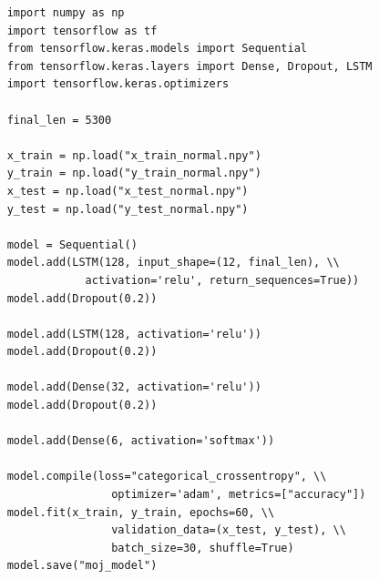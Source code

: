 \documentclass[times, utf8, diplomski]{fer}
\begin{document}
\begin{lstlisting}
    import numpy as np
    import tensorflow as tf
    from tensorflow.keras.models import Sequential
    from tensorflow.keras.layers import Dense, Dropout, LSTM
    import tensorflow.keras.optimizers

    final_len = 5300
    
    x_train = np.load("x_train_normal.npy")
    y_train = np.load("y_train_normal.npy")
    x_test = np.load("x_test_normal.npy")
    y_test = np.load("y_test_normal.npy")
    
    model = Sequential()
    model.add(LSTM(128, input_shape=(12, final_len), \\
                activation='relu', return_sequences=True))
    model.add(Dropout(0.2))
    
    model.add(LSTM(128, activation='relu'))
    model.add(Dropout(0.2))
    
    model.add(Dense(32, activation='relu'))
    model.add(Dropout(0.2))
    
    model.add(Dense(6, activation='softmax'))
    
    model.compile(loss="categorical_crossentropy", \\
                    optimizer='adam', metrics=["accuracy"])
    model.fit(x_train, y_train, epochs=60, \\
                    validation_data=(x_test, y_test), \\
                    batch_size=30, shuffle=True)
    model.save("moj_model")
\end{lstlisting}
\end{document}
